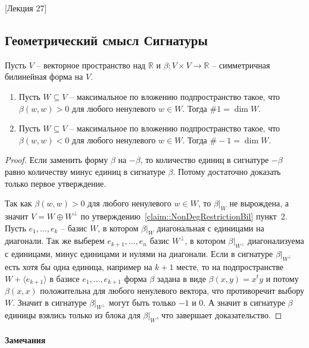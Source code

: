 [Лекция 27]


\subsection{Геометрический смысл Сигнатуры}

\begin{claim}
Пусть $V$ -- векторное пространство над $\mathbb R$ и $\beta\colon V\times V\to \mathbb R$ -- симметричная билинейная форма на $V$.
\begin{enumerate}
\item Пусть $W\subseteq V$ -- максимальное по вложению подпространство такое, что $\beta(w, w) > 0$ для любого ненулевого $w\in W$.
Тогда $\#1 = \dim W$.

\item Пусть $W\subseteq V$ -- максимальное по вложению подпространство такое, что $\beta(w, w) < 0$ для любого ненулевого $w\in W$.
Тогда $\#-1 = \dim W$.
\end{enumerate}
\end{claim}
\begin{proof}
Если заменить форму $\beta$ на $-\beta$, то количество единиц в сигнатуре $-\beta$ равно количеству минус единиц в сигнатуре $\beta$.
Потому достаточно доказать только первое утверждение.


Так как $\beta(w, w) > 0$ для любого ненулевого $w\in W$, то $\beta|_W$ не вырождена, а значит $V = W\oplus W^\bot$  по утверждению~\ref{claim::NonDegRestrictionBil} пункт~2.
Пусть $e_1,\ldots,e_k$ -- базис $W$, в котором $\beta|_W$ диагональная с единицами на диагонали.
Так же выберем $e_{k+1},\ldots,e_n$ базис $W^\bot$, в котором $\beta|_{W^\bot}$ диагонализуема с единицами, минус единицами и нулями на диагонали.
Если в сигнатуре $\beta|_{W^\bot}$ есть хотя бы одна единица, например на $k+1$ месте, то на подпространстве $W+\langle e_{k+1}\rangle$ в базисе $e_1,\ldots,e_{k+1}$ форма $\beta$ задана в виде $\beta(x, y) = x^t y$ и потому $\beta(x,x)$ положительна для любого ненулевого вектора, что противоречит выбору $W$.
Значит в сигнатуре $\beta|_{W^\bot}$ могут быть только $-1$ и $0$.
А значит в сигнатуре $\beta$ единицы взялись только из блока для $\beta|_W$, что завершает доказательство.
\end{proof}

\paragraph{Замечания}

